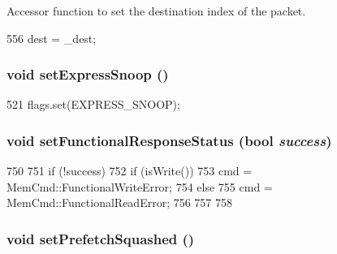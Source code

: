 Accessor function to set the destination index of the packet. 


\begin{DoxyCode}
556 { dest = _dest; }
\end{DoxyCode}
\hypertarget{classPacket_a556d03576cc3d726f41c7e1ad6fbb64a}{
\subsubsection[{setExpressSnoop}]{\setlength{\rightskip}{0pt plus 5cm}void setExpressSnoop ()}}
\label{classPacket_a556d03576cc3d726f41c7e1ad6fbb64a}



\begin{DoxyCode}
521 { flags.set(EXPRESS_SNOOP); }
\end{DoxyCode}
\hypertarget{classPacket_a61715904f754e7788941e838fca1dcb9}{
\subsubsection[{setFunctionalResponseStatus}]{\setlength{\rightskip}{0pt plus 5cm}void setFunctionalResponseStatus (bool {\em success})}}
\label{classPacket_a61715904f754e7788941e838fca1dcb9}



\begin{DoxyCode}
750     {
751         if (!success) {
752             if (isWrite()) {
753                 cmd = MemCmd::FunctionalWriteError;
754             } else {
755                 cmd = MemCmd::FunctionalReadError;
756             }
757         }
758     }
\end{DoxyCode}
\hypertarget{classPacket_a49108ef8d9510ea6b9982e9e97ca971b}{
\subsubsection[{setPrefetchSquashed}]{\setlength{\rightskip}{0pt plus 5cm}void setPrefetchSquashed ()}}
\label{classPacket_a49108ef8d9510ea6b9982e9e97ca971b}



